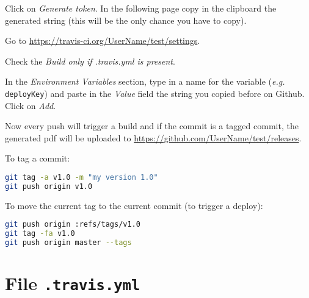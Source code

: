 \documentclass[12pt]{article}
\begin{document}
Click on \emph{Generate token}. In the following page copy in the clipboard the generated string (this will be the only chance you have to copy).

Go to \url{https://travis-ci.org/UserName/test/settings}. 

Check the \emph{Build only if .travis.yml is present}.

In the \emph{Environment Variables} section, type in a name for the variable (\emph{e.g.} \texttt{deployKey}) and paste in the \emph{Value} field the string you copied before on Github. Click on \emph{Add}.

Now every push will trigger a build and if the commit is a tagged commit, the generated pdf will be uploaded to \url{https://github.com/UserName/test/releases}.

To tag a commit:
\begin{lstlisting}[language=Bash] 
git tag -a v1.0 -m "my version 1.0"
git push origin v1.0
\end{lstlisting}

To move the current tag to the current commit (to trigger a deploy):
\begin{lstlisting}[language=Bash] 
git push origin :refs/tags/v1.0
git tag -fa v1.0
git push origin master --tags
\end{lstlisting}

\section*{File \texttt{.travis.yml}}


\end{document}
